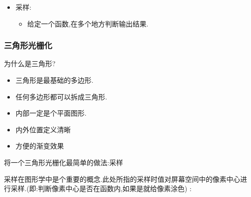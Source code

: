 \documentclass[UTF8,12pt]{ctexbook}
\begin{document}
{{{{{\begin{itemize}
{                \begin{itemize}
                  \item 认为屏幕的左下角是原点,向上是Y,向右是X.
                  \item 像素的坐标都是用$(x,y)$描述的,$x,y$是整数.
                  \item 像素的下标范围是从$(0,0)$到$(width - 1,height - 1)$.
                  \item 像素的中心总是位于$(x + 0.5,y + 0.5)$.
                  \item 屏幕被覆盖到的范围是从$(0,0)$到$(width,height)$(全部铺满).
                \end{itemize}
                }
          \item{
                采样:
                \begin{itemize}
                  \item 给定一个函数,在多个地方判断输出结果.
                \end{itemize}
                }
        \end{itemize}
      }%

      \subsubsection{三角形光栅化}{
        为什么是三角形?
        \begin{itemize}
          \item 三角形是最基础的多边形.
          \item 任何多边形都可以拆成三角形.
          \item 内部一定是个平面图形.
          \item 内外位置定义清晰
          \item 方便的渐变效果
        \end{itemize}

        将一个三角形光栅化最简单的做法:采样

        采样在图形学中是个重要的概念.此处所指的采样时值对屏幕空间中的像素中心进行采样.(即:判断像素中心是否在函数内,如果是就给像素涂色) :

}}}}}
\end{document}
